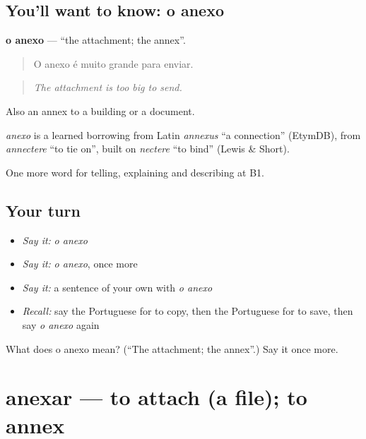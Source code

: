\subsection*{You'll want to know: o anexo}
\textbf{o anexo} — \textquotedblleft{}the attachment; the annex\textquotedblright{}.

\begin{quote}
O anexo é muito grande para enviar.
\end{quote}

\begin{quote}
\emph{The attachment is too big to send.}
\end{quote}

Also an annex to a building or a document.

\begin{cousinweb}
\emph{anexo} is a learned borrowing from Latin \emph{annexus} \textquotedblleft{}a connection\textquotedblright{} (EtymDB), from \emph{annectere} \textquotedblleft{}to tie on\textquotedblright{}, built on \emph{nectere} \textquotedblleft{}to bind\textquotedblright{} (Lewis \& Short).
\end{cousinweb}

\begin{grammarlens}[title={What you've built}]
One more word for telling, explaining and describing at B1.
\end{grammarlens}

\subsection*{Your turn}
\begin{itemize}
\raggedright
  \item \emph{Say it:} \emph{o anexo}
  \item \emph{Say it:} \emph{o anexo}, once more
  \item \emph{Say it:} a sentence of your own with \emph{o anexo}
  \item \emph{Recall:} say the Portuguese for to copy, then the Portuguese for to save, then say \emph{o anexo} again
\end{itemize}

\begin{tcolorbox}[breakable,colback=teal!4,colframe=teal!35!black,title={Before you move on}]
What does o anexo mean? (\textquotedblleft{}The attachment; the annex\textquotedblright{}.) Say it once more.
\end{tcolorbox}
\section[anexar]{anexar — to attach (a file); to annex}

